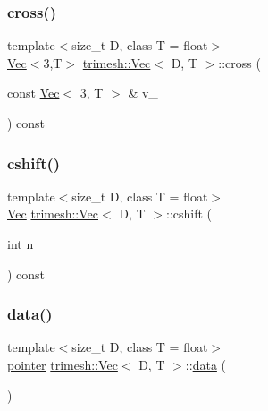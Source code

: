 \mbox{\label{classtrimesh_1_1Vec_ab7b5a993ec53b35a31827825bcb4cc60}} 
\subsubsection{\texorpdfstring{cross()}{cross()}}
{\footnotesize\ttfamily template$<$size\+\_\+t D, class T = float$>$ \\
\hyperlink{classtrimesh_1_1Vec}{Vec}$<$3,T$>$ \hyperlink{classtrimesh_1_1Vec}{trimesh\+::\+Vec}$<$ D, T $>$\+::cross (\begin{DoxyParamCaption}\item[{const \hyperlink{classtrimesh_1_1Vec}{Vec}$<$ 3, T $>$ \&}]{v\+\_\+ }\end{DoxyParamCaption}) const\hspace{0.3cm}{\ttfamily [inline]}}

\mbox{\label{classtrimesh_1_1Vec_a1bdc9773bcfc07ee1db8aa7d6bcd35a8}} 
\subsubsection{\texorpdfstring{cshift()}{cshift()}}
{\footnotesize\ttfamily template$<$size\+\_\+t D, class T = float$>$ \\
\hyperlink{classtrimesh_1_1Vec}{Vec} \hyperlink{classtrimesh_1_1Vec}{trimesh\+::\+Vec}$<$ D, T $>$\+::cshift (\begin{DoxyParamCaption}\item[{int}]{n }\end{DoxyParamCaption}) const\hspace{0.3cm}{\ttfamily [inline]}}

\mbox{\label{classtrimesh_1_1Vec_a77e1b584ae2890dc8ed72e887fa371ad}} 
\subsubsection{\texorpdfstring{data()}{data()}\hspace{0.1cm}{\footnotesize\ttfamily [1/2]}}
{\footnotesize\ttfamily template$<$size\+\_\+t D, class T = float$>$ \\
\hyperlink{classtrimesh_1_1Vec_aa424b6ab52371a9b0f99f422b1aa1d26}{pointer} \hyperlink{classtrimesh_1_1Vec}{trimesh\+::\+Vec}$<$ D, T $>$\+::\hyperlink{namespacetrimesh_ad9c3b218c6c8bf976dbcd9afb8740bb8}{data} (\begin{DoxyParamCaption}{ }\end{DoxyParamCaption})\hspace{0.3cm}{\ttfamily [inline]}}

